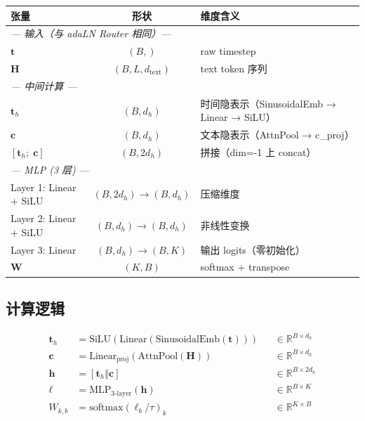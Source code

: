 \documentclass[11pt,a4paper]{article}
\newcommand{\softmax}{\mathrm{softmax}}
\newcommand{\concat}{\mathbin\Vert}
\newcommand{\R}{\mathbb{R}}
\begin{document}
\begin{center}
\small
\begin{tabular}{lcp{7.5cm}}
\toprule
\textbf{张量} & \textbf{形状} & \textbf{维度含义} \\
\midrule
\multicolumn{3}{l}{\textit{--- 输入（与 adaLN Router 相同）---}} \\
$\mathbf{t}$ & $(B,)$ & raw timestep \\
$\mathbf{H}$ & $(B, L, d_{\text{text}})$ & text token 序列 \\
\midrule
\multicolumn{3}{l}{\textit{--- 中间计算 ---}} \\
$\mathbf{t}_h$ & $(B, d_h)$ & 时间隐表示（SinusoidalEmb → Linear → SiLU） \\
$\mathbf{c}$ & $(B, d_h)$ & 文本隐表示（AttnPool → c\_proj） \\
$[\mathbf{t}_h;\; \mathbf{c}]$ & $(B, 2d_h)$ & 拼接（dim=-1 上 concat） \\
\midrule
\multicolumn{3}{l}{\textit{--- MLP (3 层) ---}} \\
Layer 1: Linear + SiLU & $(B, 2d_h) \to (B, d_h)$ & 压缩维度 \\
Layer 2: Linear + SiLU & $(B, d_h) \to (B, d_h)$ & 非线性变换 \\
Layer 3: Linear & $(B, d_h) \to (B, K)$ & 输出 logits（零初始化） \\
\midrule
$\mathbf{W}$ & $(K, B)$ & softmax + transpose \\
\bottomrule
\end{tabular}
\end{center}

\subsection{计算逻辑}

\begin{align}
\mathbf{t}_h &= \text{SiLU}(\text{Linear}(\text{SinusoidalEmb}(\mathbf{t}))) && \in \R^{B \times d_h} \\
\mathbf{c} &= \text{Linear}_{\text{proj}}(\text{AttnPool}(\mathbf{H})) && \in \R^{B \times d_h} \\[0.5em]
\mathbf{h} &= [\mathbf{t}_h \concat \mathbf{c}] && \in \R^{B \times 2d_h} \\
\bm{\ell} &= \text{MLP}_{3\text{-layer}}(\mathbf{h}) && \in \R^{B \times K} \\
W_{k,b} &= \softmax(\bm{\ell}_b / \tau)_k && \in \R^{K \times B}
\end{align}
\end{document}
